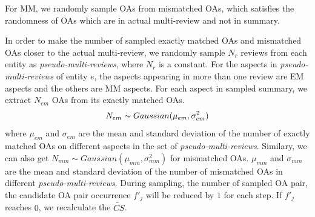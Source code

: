 {{%
For MM,
we randomly sample OAs from mismatched OAs,
which satisfies the randomness
of OAs which are in actual multi-review 
and not in summary.

In order to make the number of sampled exactly matched OAs and
mismatched OAs closer to the actual multi-review,
we randomly sample $N_r$ reviews from each entity
as {\em pseudo-multi-reviews}, 
where $N_r$ is a constant.
For the aspects in {\em pseudo-multi-reviews} of entity $e$, 
the aspects appearing in more than one review are EM aspects
and the others are MM aspects.
For each aspect in sampled summary, 
we extract $N_{em}$ OAs from its exactly matched OAs.
\begin{equation}
	\small
N_{em} \sim Gaussian(\mu_{em}, \sigma_{em}^2)
\end{equation}
where $\mu_{em}$ and $\sigma_{em}$ are the mean and standard deviation of
the number of exactly matched OAs on different aspects 
in the set of {\em pseudo-multi-reviews}.
Similary, we can also get 
$N_{mm} \sim Gaussian(\mu_{mm}, \sigma_{mm}^2)$ 
for mismatched OAs.
$\mu_{mm}$ and $\sigma_{mm}$ are the mean and standard deviation of
the number of mismatched OAs in different {\em pseudo-multi-reviews}.
During sampling, the number of sampled OA pair, the candidate OA pair occurrence $f'_j$ will be 
reduced by $1$ for each step.
If $f'_j$ reaches $0$,
we recalculate the $\widetilde{CS}$.


}}
